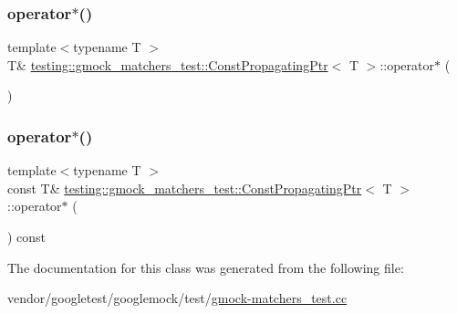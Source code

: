 \mbox{\label{classtesting_1_1gmock__matchers__test_1_1_const_propagating_ptr_ad77bbeaa18f84cbd6f3dc7021904f1e3}} 
\subsubsection{\texorpdfstring{operator$\ast$()}{operator*()}\hspace{0.1cm}{\footnotesize\ttfamily [1/2]}}
{\footnotesize\ttfamily template$<$typename T $>$ \\
T\& \hyperlink{classtesting_1_1gmock__matchers__test_1_1_const_propagating_ptr}{testing\+::gmock\+\_\+matchers\+\_\+test\+::\+Const\+Propagating\+Ptr}$<$ T $>$\+::operator$\ast$ (\begin{DoxyParamCaption}{ }\end{DoxyParamCaption})\hspace{0.3cm}{\ttfamily [inline]}}

\mbox{\label{classtesting_1_1gmock__matchers__test_1_1_const_propagating_ptr_aad99a528754294ab397378034686ae3a}} 
\subsubsection{\texorpdfstring{operator$\ast$()}{operator*()}\hspace{0.1cm}{\footnotesize\ttfamily [2/2]}}
{\footnotesize\ttfamily template$<$typename T $>$ \\
const T\& \hyperlink{classtesting_1_1gmock__matchers__test_1_1_const_propagating_ptr}{testing\+::gmock\+\_\+matchers\+\_\+test\+::\+Const\+Propagating\+Ptr}$<$ T $>$\+::operator$\ast$ (\begin{DoxyParamCaption}{ }\end{DoxyParamCaption}) const\hspace{0.3cm}{\ttfamily [inline]}}



The documentation for this class was generated from the following file\+:\begin{DoxyCompactItemize}
\item 
vendor/googletest/googlemock/test/\hyperlink{gmock-matchers__test_8cc}{gmock-\/matchers\+\_\+test.\+cc}\end{DoxyCompactItemize}
